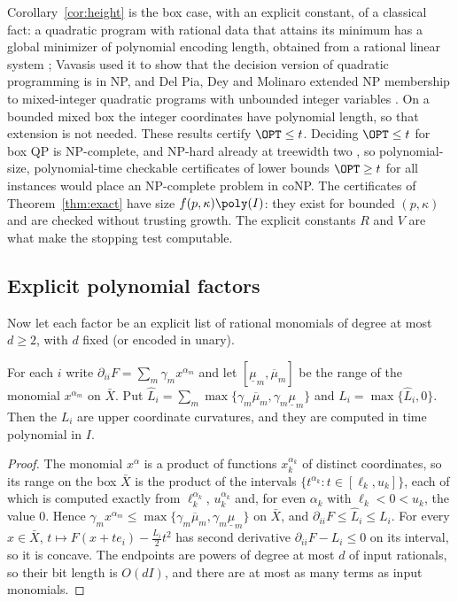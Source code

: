 \begin{remark}\label{rem:np}
Corollary~\ref{cor:height} is the box case, with an explicit constant, of a
classical fact: a quadratic program with rational data that attains its
minimum has a global minimizer of polynomial encoding length, obtained from
a rational linear system \cite{Vavasis1990}; Vavasis used it to show that the
decision version of quadratic programming is in NP, and Del Pia, Dey and
Molinaro extended NP membership to mixed-integer quadratic programs with
unbounded integer variables \cite{DelPiaDeyMolinaro2017}. On a bounded
mixed box the integer coordinates have polynomial length, so that extension
is not needed. These results certify $\OPT\le t$. Deciding $\OPT\le t$ for
box QP is NP-complete, and NP-hard already at treewidth two
\cite{DelPiaKhajavirad2026}, so polynomial-size, polynomial-time checkable
certificates of lower bounds $\OPT\ge t$ for all instances would place an
NP-complete problem in coNP. The
certificates of Theorem~\ref{thm:exact} have size $f(p,\kappa)\poly(I)$:
they exist for bounded $(p,\kappa)$ and are checked without trusting
growth. The explicit constants $R$ and $V$ are what make the stopping test
computable.
\end{remark}

\subsection{Explicit polynomial factors}\label{sec:polynomial}

Now let each factor be an explicit list of rational monomials of degree at
most $d\ge2$, with $d$ fixed (or encoded in unary).

\begin{lemma}\label{lem:intcurv}
For each $i$ write $\partial_{ii}F=\sum_m\gamma_mx^{\alpha_m}$ and let
$[\underline\mu_m,\overline\mu_m]$ be the range of the monomial $x^{\alpha_m}$
on $\bar X$. Put $\hat L_i=\sum_m\max\{\gamma_m\overline\mu_m,
\gamma_m\underline\mu_m\}$ and $L_i=\max\{\hat L_i,0\}$. Then the $L_i$ are
upper coordinate curvatures, and they are computed in time polynomial in $I$.
\end{lemma}

\begin{proof}
The monomial $x^{\alpha}$ is a product of functions $x_k^{\alpha_k}$ of
distinct coordinates, so its range on the box $\bar X$ is the product of the
intervals $\{t^{\alpha_k}:t\in[\ell_k,u_k]\}$, each of which is computed
exactly from $\ell_k^{\alpha_k}$, $u_k^{\alpha_k}$ and, for even $\alpha_k$
with $\ell_k<0<u_k$, the value $0$. Hence
$\gamma_mx^{\alpha_m}\le\max\{\gamma_m\overline\mu_m,\gamma_m\underline\mu_m\}$
on $\bar X$, and $\partial_{ii}F\le\hat L_i\le L_i$. For every $x\in\bar X$,
$t\mapsto F(x+te_i)-\frac{L_i}2t^2$ has second derivative
$\partial_{ii}F-L_i\le0$ on its interval, so it is concave. The endpoints are
powers of degree at most $d$ of input rationals, so their bit length is
$O(dI)$, and there are at most as many terms as input monomials.
\end{proof}

